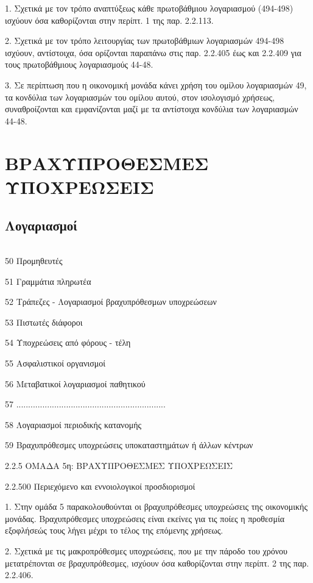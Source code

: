 \documentclass[A4,10pt,greek]{book}
\begin{document}
1. Σχετικά με τον τρόπο αναπτύξεως κάθε πρωτοβάθμιου λογαριασμού (494-498) ισχύουν όσα καθορίζονται στην περίπτ. 1 της παρ. 2.2.113.

2. Σχετικά με τον τρόπο λειτουργίας των πρωτοβάθμιων λογαριασμών 494-498 ισχύουν, αντίστοιχα, όσα ορίζονται παραπάνω στις παρ. 2.2.405 έως και 2.2.409 για τους πρωτοβάθμιους λογαριασμούς 44-48.

3. Σε περίπτωση που η οικονομική μονάδα κάνει χρήση του ομίλου λογαριασμών 49, τα κονδύλια των λογαριασμών του ομίλου αυτού, στον ισολογισμό χρήσεως, συναθροίζονται και εμφανίζονται μαζί με τα αντίστοιχα κονδύλια των λογαριασμών 44-48.


\chapter{ΒΡΑΧΥΠΡΟΘΕΣΜΕΣ ΥΠΟΧΡΕΩΣΕΙΣ}

\section{Λογαριασμοί}

\begin{tabularx}{\linewidth}{lX}

\end{tabularx}

50 Προμηθευτές

51 Γραμμάτια πληρωτέα

52 Τράπεζες - Λογαριασμοί βραχυπρόθεσμων υποχρεώσεων

53 Πιστωτές διάφοροι

54 Υποχρεώσεις από φόρους - τέλη

55 Ασφαλιστικοί οργανισμοί

56 Μεταβατικοί λογαριασμοί παθητικού

57 ...............................................................

58 Λογαριασμοί περιοδικής κατανομής

59 Βραχυπρόθεσμες υποχρεώσεις υποκαταστημάτων ή άλλων κέντρων 

2.2.5 ΟΜΑΔΑ 5η: ΒΡΑΧΥΠΡΟΘΕΣΜΕΣ ΥΠΟΧΡΕΩΣΕΙΣ

2.2.500 Περιεχόμενο και εννοιολογικοί προσδιορισμοί

1. Στην ομάδα 5 παρακολουθούνται οι βραχυπρόθεσμες υποχρεώσεις της οικονομικής μονάδας. Βραχυπρόθεσμες υποχρεώσεις είναι εκείνες για τις ποίες η προθεσμία εξοφλήσεώς τους λήγει μέχρι το τέλος της επόμενης χρήσεως.

2. Σχετικά με τις μακροπρόθεσμες υποχρεώσεις, που με την πάροδο του χρόνου μετατρέπονται σε βραχυπρόθεσμες, ισχύουν όσα καθορίζονται στην περίπτ. 2 της παρ. 2.2.406.
\end{document}
